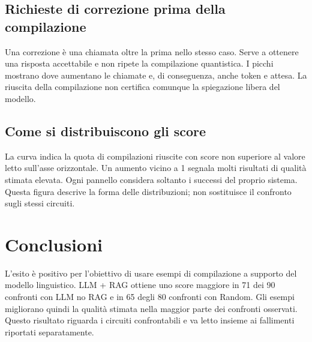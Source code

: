 \clearpage{}\begin{landscape}\pagestyle{empty}\TestLandscapePagetrue
\subsection{Richieste di correzione prima della compilazione}
Una correzione è una chiamata oltre la prima nello stesso caso. Serve a ottenere una risposta accettabile e non ripete la compilazione quantistica. I picchi mostrano dove aumentano le chiamate e, di conseguenza, anche token e attesa. La riuscita della compilazione non certifica comunque la spiegazione libera del modello.

\begin{center}

\end{center}\end{landscape}\restoregeometry
\clearpage{}\begin{landscape}\pagestyle{empty}\TestLandscapePagetrue
\subsection{Come si distribuiscono gli score}
La curva indica la quota di compilazioni riuscite con score non superiore al valore letto sull’asse orizzontale. Un aumento vicino a 1 segnala molti risultati di qualità stimata elevata. Ogni pannello considera soltanto i successi del proprio sistema. Questa figura descrive la forma delle distribuzioni; non sostituisce il confronto sugli stessi circuiti.

\begin{center}

\end{center}\end{landscape}\restoregeometry
\clearpage\section{Conclusioni}
L’esito è positivo per l’obiettivo di usare esempi di compilazione a supporto del modello linguistico. LLM + RAG ottiene uno score maggiore in 71 dei 90 confronti con LLM no RAG e in 65 degli 80 confronti con Random. Gli esempi migliorano quindi la qualità stimata nella maggior parte dei confronti osservati. Questo risultato riguarda i circuiti confrontabili e va letto insieme ai fallimenti riportati separatamente.

